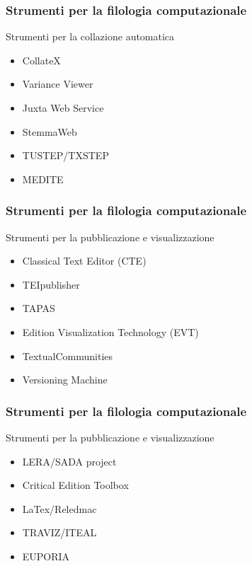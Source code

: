 \begin{frame}
	\frametitle{Strumenti per la filologia computazionale}
	\addtocounter{nframe}{1}
    \begin{block}{Strumenti per la collazione automatica}
		\begin{itemize}
			\item CollateX
			\item Variance Viewer
			\item Juxta Web Service
			\item StemmaWeb
			\item TUSTEP/TXSTEP
			\item MEDITE
		\end{itemize}
	\end{block}
\end{frame}

\begin{frame}
	\frametitle{Strumenti per la filologia computazionale}
	\addtocounter{nframe}{1}
    \begin{block}{Strumenti per la pubblicazione e visualizzazione}
		\begin{itemize}
			\item Classical Text Editor (CTE)
			\item TEIpublisher
			\item TAPAS
			\item Edition Visualization Technology (EVT)
			\item TextualCommunities
			\item Versioning Machine
		\end{itemize}
	\end{block}
\end{frame}

\begin{frame}
	\frametitle{Strumenti per la filologia computazionale}
	\addtocounter{nframe}{1}
    \begin{block}{Strumenti per la pubblicazione e visualizzazione}
		\begin{itemize}
			\item LERA/SADA project
			\item Critical Edition Toolbox
			\item LaTex/Reledmac
			\item TRAVIZ/ITEAL
			\item EUPORIA
		\end{itemize}
	\end{block}
\end{frame}

